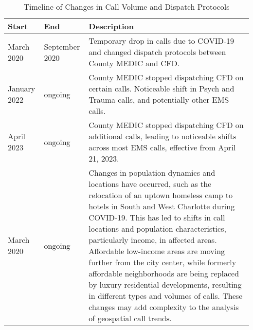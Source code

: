 \begin{table}[h]
    \centering
    \begin{tabular}{p{} p{} p{}}
        \toprule
        \textbf{Start} & \textbf{End} & \textbf{Description} \\
        \midrule
        March 2020 & September 2020 & Temporary drop in calls due to COVID-19 and changed dispatch protocols between County MEDIC and CFD. \\
        \midrule
        January 2022 & ongoing & County MEDIC stopped dispatching CFD on certain calls. Noticeable shift in Psych and Trauma calls, and potentially other EMS calls. \\
        \midrule
        April 2023 & ongoing & County MEDIC stopped dispatching CFD on additional calls, leading to noticeable shifts across most EMS calls, effective from April 21, 2023. \\
        \midrule
        March 2020 & ongoing & Changes in population dynamics and locations have occurred, such as the relocation of an uptown homeless camp to hotels in South and West Charlotte during COVID-19. This has led to shifts in call locations and population characteristics, particularly income, in affected areas. Affordable low-income areas are moving further from the city center, while formerly affordable neighborhoods are being replaced by luxury residential developments, resulting in different types and volumes of calls. These changes may add complexity to the analysis of geospatial call trends. \\
        \bottomrule
    \end{tabular}
    \caption{Timeline of Changes in Call Volume and Dispatch Protocols}
    \label{tab:call_volume_changes}
\end{table}

